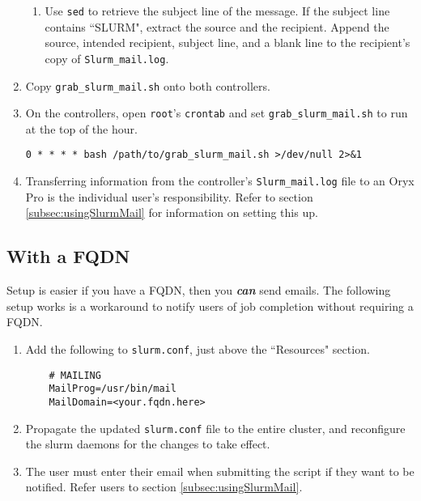 \begin{enumerate}
\begin{enumerate}
      \item Use \texttt{sed} to retrieve the subject line of the message. If the subject line contains ``SLURM", extract the source and the recipient. Append the source, intended recipient, subject line, and a blank line to the recipient's copy of \texttt{Slurm\_mail.log}. 
    \end{enumerate}

  \item Copy \texttt{grab\_slurm\_mail.sh} onto both controllers.

  \item On the controllers, open \texttt{root}'s \texttt{crontab} and set \texttt{grab\_slurm\_mail.sh} to run at the top of the hour.

    \texttt{0 *  * * * bash /path/to/grab\_slurm\_mail.sh >/dev/null 2>\&1}

  \item Transferring information from the controller's \texttt{Slurm\_mail.log} file to an Oryx Pro is the individual user's responsibility. Refer to section \ref{subsec:usingSlurmMail} for information on setting this up.
\end{enumerate}

\subsection{With a FQDN} \label{subsec:mail_FQDN}

Setup is easier if you have a FQDN, then you \textbf{\emph{can}} send emails. The following setup works is a workaround to notify users of job completion without requiring a FQDN. 

\begin{enumerate}
  \item Add the following to \texttt{slurm.conf}, just above the ``Resources" section.

	\begin{verbatim}
	# MAILING
	MailProg=/usr/bin/mail
	MailDomain=<your.fqdn.here>
	\end{verbatim}

  \item Propagate the updated \texttt{slurm.conf} file to the entire cluster, and reconfigure the slurm daemons for the changes to take effect.

  \item The user must enter their email when submitting the script if they want to be notified. Refer users to section \ref{subsec:usingSlurmMail}. 
\end{enumerate}

